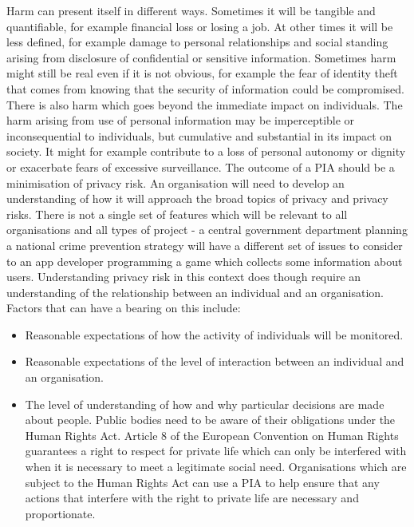 \documentclass{article}
\begin{document}
Harm can present itself in different ways. Sometimes it will be tangible and quantifiable, for example financial loss or losing a job. At other times it will be less defined, for example damage to personal relationships and social standing arising from disclosure of confidential or sensitive information. Sometimes harm might still be real even if it is not obvious, for example the fear of identity theft that comes from knowing that the security of information could be compromised. There is also harm which goes beyond the immediate impact on individuals. The harm arising from use of personal information may be imperceptible or inconsequential to individuals, but cumulative and substantial in its impact on society. It might for example contribute to a loss of personal autonomy or dignity or exacerbate fears of excessive surveillance. The outcome of a PIA should be a minimisation of privacy risk. An organisation will need to develop an understanding of how it will approach the broad topics of privacy and privacy risks. There is not a single set of features which will be relevant to all organisations and all types of project - a central government department planning a national crime prevention strategy will have a different set of issues to consider to an app developer programming a game which collects some information about users. Understanding privacy risk in this context does though require an understanding of the relationship between an individual and an organisation. Factors that can have a bearing on this include: 
\begin{itemize}
\item Reasonable expectations of how the activity of individuals will be monitored.
\item Reasonable expectations of the level of interaction between an individual and an organisation.
\item The level of understanding of how and why particular decisions are made about people. Public bodies need to be aware of their obligations under the Human Rights Act. Article 8 of the European Convention on Human Rights guarantees a right to respect for private life which can only be interfered with when it is necessary to meet a legitimate social need. Organisations which are subject to the Human Rights Act can use a PIA to help ensure that any actions that interfere with the right to private life are necessary and proportionate.
\end{itemize}
\end{document}
